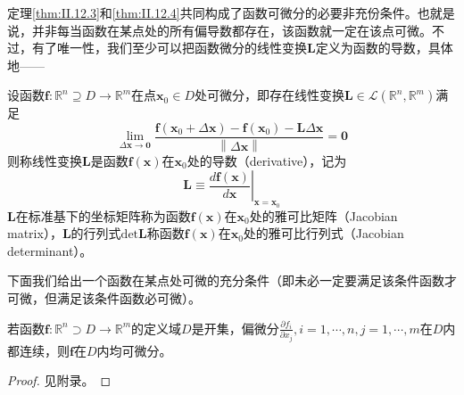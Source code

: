 \documentclass[main.tex]{subfiles}
\begin{document}
定理\ref{thm:II.12.3}和\ref{thm:II.12.4}共同构成了函数可微分的必要非充份条件。也就是说，并非每当函数在某点处的所有偏导数都存在，该函数就一定在该点可微\cite[“例2”,p.~21]{华工高数2009下}。不过，有了唯一性，我们至少可以把函数微分的线性变换$\mathbf{L}$定义为函数的导数，具体地——

\begin{definition}[向量函数的导数]
设函数$\mathbf{f}:\mathbb{R}^n\supseteq D\rightarrow\mathbb{R}^m$在点$\mathbf{x}_0\in D$处可微分，即存在线性变换$\mathbf{L}\in\mathcal{L}\left(\mathbb{R}^n,\mathbb{R}^m\right)$满足
\[
\lim_{\Delta\mathbf{x}\to\mathbf{0}}\frac{\mathbf{f}\left(\mathbf{x}_0+\Delta \mathbf{x}\right)-\mathbf{f}\left(\mathbf{x}_0\right)-\mathbf{L}\Delta\mathbf{x}}{\left\|\Delta\mathbf{x}\right\|}=\mathbf{0}
\]
则称线性变换$\mathbf{L}$是函数$\mathbf{f}\left(\mathbf{x}\right)$在$\mathbf{x}_0$处的导数（derivative），记为
\[\mathbf{L}\equiv\left.\frac{d\mathbf{f}\left(\mathbf{x}\right)}{d\mathbf{x}}\right|_{\mathbf{x}=\mathbf{x}_0}\]
$\mathbf{L}$在标准基下的坐标矩阵称为函数$\mathbf{f}\left(\mathbf{x}\right)$在$\mathbf{x}_0$处的雅可比矩阵（Jacobian matrix），$\mathbf{L}$的行列式$\mathrm{det}\mathbf{L}$称函数$\mathbf{f}\left(\mathbf{x}\right)$在$\mathbf{x}_0$处的雅可比行列式（Jacobian determinant）。
\end{definition}

下面我们给出一个函数在某点处可微的充分条件（即未必一定要满足该条件函数才可微，但满足该条件函数必可微）\cite[“例3”,p.~23]{华工高数2009下}。

\begin{theorem}\label{thm:II.12.5}
若函数$\mathbf{f}:\mathbb{R}^n\supset D\rightarrow\mathbb{R}^m$的定义域$D$是开集，偏微分$\frac{\partial f_i}{\partial x_j},i=1,\cdots,n,j=1,\cdots,m$在$D$内都连续，则$\mathbf{f}$在$D$内均可微分。
\end{theorem}
\begin{proof}
见附录。
\end{proof}
\end{document}
